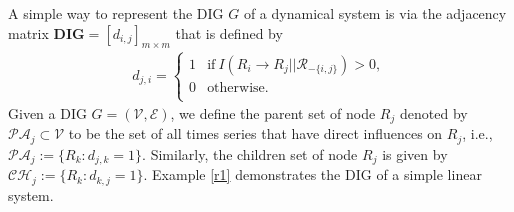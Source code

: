 A simple way to represent the DIG $G$ of a dynamical system is via the adjacency matrix $\textbf{DIG}=[d_{i,j}]_{m\times m}$ that is defined by
\begin{align}
    d_{j,i} = \left\{
\begin{array}{ll}
      1 & \text{if}\  I(R_i\rightarrow R_j||\mathcal{R}_{-\{i,j\}})>0,\\
      0 & \text{otherwise}. \\
\end{array} 
\right. 
\end{align}
Given a DIG $G=(\mathcal{V},\mathcal{E})$, we define the parent set of node $R_j$ denoted by $\mathcal{PA}_j\subset \mathcal{V}$ to be the set of all times series that have direct influences on $R_j$, i.e., $\mathcal{PA}_j:=\{R_k: d_{j,k}=1\}$. Similarly, the children set of node $R_j$ is given by $\mathcal{CH}_j:=\{R_k: d_{k,j}=1\}$. 
Example \ref{r1} demonstrates the DIG of a simple linear system.
